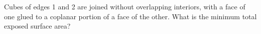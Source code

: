 Cubes of edges 1 and 2 are joined without overlapping interiors, with a face of one glued to a coplanar portion of a face of the other. What is the minimum total exposed surface area?
